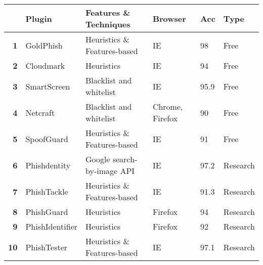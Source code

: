 \begin{center}
	\small
	\begin{tabular}{  m{0.5em}  m{6em}  m{13.3em}  m{8.5em}  m{2.3em}  m{4.3em}  } \toprule

		                                & \textbf{Plugin } & \textbf{Features \& Techniques} & \textbf{Browser}    & \textbf{Acc} & \textbf{Type} \\ \midrule

		\multicolumn{1}{r}{\textbf{1}}  & GoldPhish        & Heuristics \& Features-based    & IE                  & 98           & Free          \\

		\multicolumn{1}{r}{\textbf{2}}  & Cloudmark        & Heuristics                      & IE                  & 94           & Free          \\

		\multicolumn{1}{r}{\textbf{3}}  & SmartScreen      & Blacklist and whitelist         & IE                  & 95.9         & Free          \\

		\multicolumn{1}{r}{\textbf{4}}  & Netcraft         & Blacklist and whitelist         & Chrome, Firefox     & 90           & Free          \\

		\multicolumn{1}{r}{\textbf{5}}  & SpoofGuard       & Heuristics \& Features-based    & IE                  & 91           & Free          \\

		\multicolumn{1}{r}{\textbf{6}}  & Phishdentity     & Google search-by-image API      & IE                  & 97.2         & Research      \\

		\multicolumn{1}{r}{\textbf{7}}  & PhishTackle      & Heuristics \& Features-based    & IE                  & 91.3         & Research      \\

		\multicolumn{1}{r}{\textbf{8}}  & PhishGuard       & Heuristics                      & Firefox             & 94           & Research      \\

		\multicolumn{1}{r}{\textbf{9}}  & PhishIdentifier  & Heuristics                      & Firefox             & 92           & Research      \\

		\multicolumn{1}{r}{\textbf{10}} & PhishTester      & Heuristics \& Features-based    & IE                  & 97.1         & Research      \\


\end{tabular}
\end{center}

